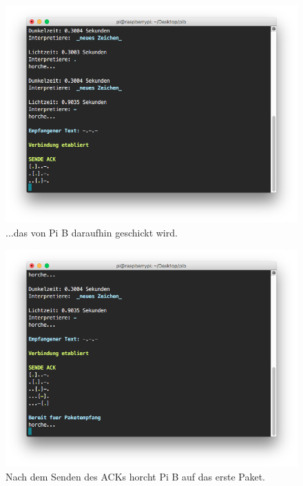 \documentclass[12pt, a4paper]{article}
\begin{document}
\newpage
\begin{figure}[H]
	\centering
	\includegraphics[width=1.0\textwidth]{sshot_13.png}
	\caption{...das von Pi B daraufhin geschickt wird.}
\end{figure}

\newpage
\begin{figure}[H]
	\centering
	\includegraphics[width=1.0\textwidth]{sshot_14.png}
	\caption{Nach dem Senden des ACKs horcht Pi B auf das erste Paket.}
\end{figure}
\end{document}
